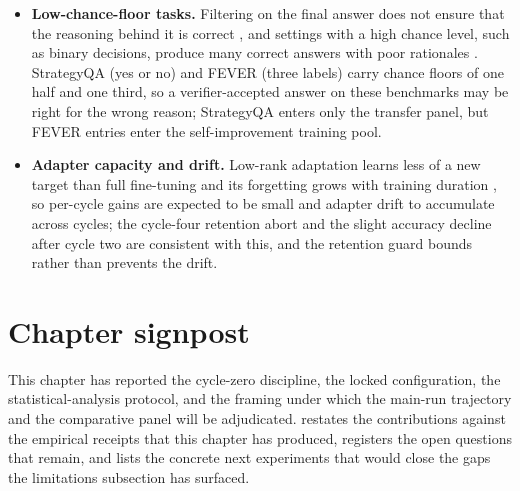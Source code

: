 \begin{itemize}
\item \textbf{Low-chance-floor tasks.} Filtering on the final answer does not ensure that the reasoning behind it is correct \cite{ho2023large}, and settings with a high chance level, such as binary decisions, produce many correct answers with poor rationales \cite{NEURIPS2022_639a9a17}. StrategyQA (yes or no) and FEVER (three labels) carry chance floors of one half and one third, so a verifier-accepted answer on these benchmarks may be right for the wrong reason; StrategyQA enters only the transfer panel, but FEVER entries enter the self-improvement training pool.
\item \textbf{Adapter capacity and drift.} Low-rank adaptation learns less of a new target than full fine-tuning and its forgetting grows with training duration \cite{biderman2024lora}, so per-cycle gains are expected to be small and adapter drift to accumulate across cycles; the cycle-four retention abort and the slight accuracy decline after cycle two are consistent with this, and the retention guard bounds rather than prevents the drift.
\end{itemize}

\section{Chapter signpost}
\label{sec:ch5-signpost}

This chapter has reported the cycle-zero discipline, the locked configuration, the statistical-analysis protocol, and the framing under which the main-run trajectory and the comparative panel will be adjudicated.  restates the contributions against the empirical receipts that this chapter has produced, registers the open questions that remain, and lists the concrete next experiments that would close the gaps the limitations subsection has surfaced.
